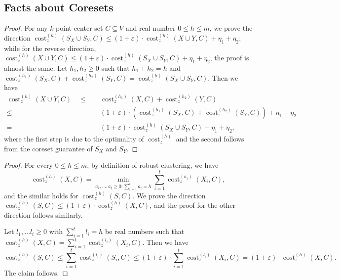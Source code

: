 \documentclass[letterpaper,11pt]{article}
\theoremstyle{plain}
\theoremstyle{definition}
\theoremstyle{remark}
\DeclareMathOperator{\cost}{cost}
\newcommand{\eps}{\varepsilon}
\begin{document}
\begin{appendices}
     \appendixpage
     \section{Facts about Coresets}
\label{sec:composability}
\ComposabilityCoresets*

\begin{proof}
    For any $k$-point center set $C\subseteq V$ and real number $0\le h\le m$, we prove the direction $\cost_z^{(h)}(S_X\cup S_Y,C)\le (1+\eps)\cdot \cost_z^{(h)}(X\cup Y,C) + \eta_1 + \eta_2$; while for the reverse direction, $\cost_z^{(h)}(X\cup Y,C)\le (1+\eps)\cdot \cost_z^{(h)}(S_X\cup S_Y,C) + \eta_1 + \eta_2$, the proof is almost the same.
Let $h_1,h_2\ge 0$ such that $h_1+h_2 = h$ and $\cost_z^{(h_1)}(S_X,C) + \cost_z^{(h_2)}(S_Y,C) = \cost_z^{(h)}(S_X\cup S_Y, C)$. Then we have 
    \begin{align*}
        \cost_z^{(h)}(X\cup Y,C)\quad\le&\quad \cost_z^{(h_1)}(X,C) + \cost_z^{(h_2)}(Y,C)\\
        \le&\quad (1+\eps)\cdot \left(\cost_z^{(h_1)}(S_X,C) + \cost_z^{(h_2)}(S_Y,C) \right) + \eta_1+\eta_2\\
        =&\quad (1+\eps)\cdot \cost_z^{(h)}(S_X\cup S_Y,C) + \eta_1+\eta_2,
    \end{align*}
    where the first step is due to the optimality of $\cost_z^{(h)}$ and the second follows from the coreset guarantee of $S_X$ and $S_Y$.
\end{proof}

\ASufficientCondition*
\begin{proof}
    For every $0\le h\le m$, by definition of robust clustering, we have 
    \begin{equation}
        \cost_z^{(h)}(X,C) = \min_{a_1,\dots,a_t\ge 0:\sum_{i=1}^t a_i = h} \sum_{i=1}^t\cost_z^{(a_i)}(X_i,C),
    \end{equation}
    and the similar holds for $\cost_z^{(h)}(S,C)$. 
    We prove the direction $\cost_z^{(h)}(S,C)\le (1+\eps)\cdot \cost_z^{(h)}(X,C)$, and the proof for the other direction follows similarly.
    
    Let $l_1,\dots l_t\ge 0$ with $\sum_{i=1}^t l_i=h$ be real numbers such that 
    $\cost_z^{(h)}(X,C) = \sum_{i=1}^t \cost_z^{(l_i)}(X_i,C)$. Then we have 
    \begin{equation}
        \cost_z^{(h)}(S,C) \le \sum_{i=1}^t \cost_z^{(l_i)}(S_i,C)\le (1+\eps)\cdot\sum_{i=1}^t\cost_z^{(l_i)}(X_i,C) = (1+\eps)\cdot \cost_z^{(h)}(X,C).
    \end{equation}
    The claim follows.
\end{proof}


\end{appendices}
\end{document}
